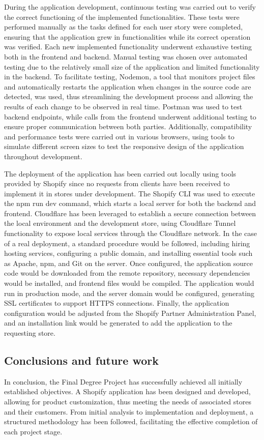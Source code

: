 \documentclass[12pt]{article}
\begin{document}
During the application development, continuous testing was carried out to verify the correct functioning 
of the implemented functionalities. These tests were performed manually as the tasks defined for each user story were completed,
ensuring that the application grew in functionalities while its correct operation was verified. Each new implemented functionality
underwent exhaustive testing both in the frontend and backend. Manual testing was chosen over automated testing due to the relatively
small size of the application and limited functionality in the backend. To facilitate testing, Nodemon, a tool that monitors project files 
and automatically restarts the application when changes in the source code are detected, was used, thus streamlining the development process 
and allowing the results of each change to be observed in real time. Postman was used to test backend endpoints, while calls from the frontend 
underwent additional testing to ensure proper communication between both parties. Additionally, compatibility and performance tests were carried 
out in various browsers, using tools to simulate different screen sizes to test the responsive design of the application throughout development.

The deployment of the application has been carried out locally using tools provided by Shopify since no requests from clients have 
been received to implement it in stores under development. The Shopify CLI was used to execute the npm run dev command, which starts 
a local server for both the backend and frontend. Cloudflare has been leveraged to establish a secure connection between the local 
environment and the development store, using Cloudflare Tunnel functionality to expose local services through the Cloudflare network. 
In the case of a real deployment, a standard procedure would be followed, including hiring hosting services, configuring a public domain, 
and installing essential tools such as Apache, npm, and Git on the server. Once configured, the application source code would be downloaded 
from the remote repository, necessary dependencies would be installed, and frontend files would be compiled. The application would run in 
production mode, and the server domain would be configured, generating SSL certificates to support HTTPS connections. Finally, the application 
configuration would be adjusted from the Shopify Partner Administration Panel, and an installation link would be generated to add the application 
to the requesting store.

\subsection{Conclusions and future work }
In conclusion, the Final Degree Project has successfully achieved all initially established objectives. A Shopify application has been 
designed and developed, allowing for product customization, thus meeting the needs of associated stores and their customers. From initial 
analysis to implementation and deployment, a structured methodology has been followed, facilitating the effective completion of each project stage.
\end{document}
